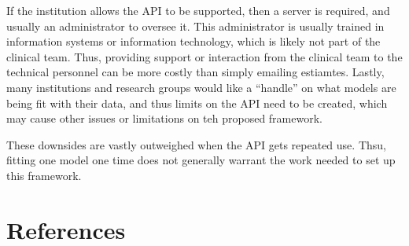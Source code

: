 \documentclass[]{elsarticle} %
\begin{document}
If the institution allows the API to be supported, then a server is
required, and usually an administrator to oversee it. This administrator
is usually trained in information systems or information technology,
which is likely not part of the clinical team. Thus, providing support
or interaction from the clinical team to the technical personnel can be
more costly than simply emailing estiamtes. Lastly, many institutions
and research groups would like a ``handle'' on what models are being fit
with their data, and thus limits on the API need to be created, which
may cause other issues or limitations on teh proposed framework.

These downsides are vastly outweighed when the API gets repeated use.
Thsu, fitting one model one time does not generally warrant the work
needed to set up this framework.

\hypertarget{references}{%
\section*{References}\label{references}}
\end{document}
